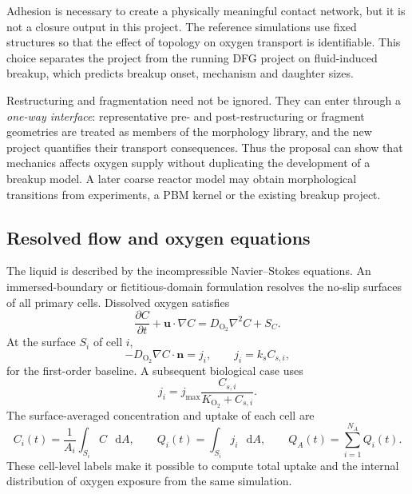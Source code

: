\documentclass[11pt,a4paper]{article}
\newcommand{\Otwo}{\mathrm{O}_2}
\newcommand{\diff}{\mathop{}\!\mathrm{d}}
\begin{document}
Adhesion is necessary to create a physically meaningful contact network, but
it is not a closure output in this project. The reference simulations use
fixed structures so that the effect of topology on oxygen transport is
identifiable. This choice separates the project from the running DFG project
on fluid-induced breakup, which predicts breakup onset, mechanism and daughter
sizes.

Restructuring and fragmentation need not be ignored. They can enter through a
\emph{one-way interface}: representative pre- and post-restructuring or
fragment geometries are treated as members of the morphology library, and the
new project quantifies their transport consequences. Thus the proposal can
show that mechanics affects oxygen supply without duplicating the development
of a breakup model. A later coarse reactor model may obtain morphological
transitions from experiments, a PBM kernel or the existing breakup project.

\subsection{Resolved flow and oxygen equations}

The liquid is described by the incompressible Navier--Stokes equations. An
immersed-boundary or fictitious-domain formulation resolves the no-slip
surfaces of all primary cells. Dissolved oxygen satisfies
\begin{equation}
  \frac{\partial C}{\partial t}
  +\boldsymbol{u}\cdot\nabla C
  =D_{\Otwo}\nabla^2C+S_C.
  \label{eq:oxygen}
\end{equation}
At the surface \(S_i\) of cell \(i\),
\begin{equation}
  -D_{\Otwo}\nabla C\cdot\boldsymbol{n}=j_i,
  \qquad
  j_i=k_s C_{s,i},
  \label{eq:first_order}
\end{equation}
for the first-order baseline. A subsequent biological case uses
\begin{equation}
  j_i=j_{\max}\frac{C_{s,i}}{K_{\Otwo}+C_{s,i}}.
  \label{eq:monod}
\end{equation}
The surface-averaged concentration and uptake of each cell are
\begin{equation}
  C_i(t)=\frac{1}{A_i}\int_{S_i}C\,\diff A,
  \qquad
  Q_i(t)=\int_{S_i}j_i\,\diff A,
  \qquad
  Q_A(t)=\sum_{i=1}^{N_A}Q_i(t).
  \label{eq:cell_outputs}
\end{equation}
These cell-level labels make it possible to compute total uptake and the
internal distribution of oxygen exposure from the same simulation.
\end{document}
